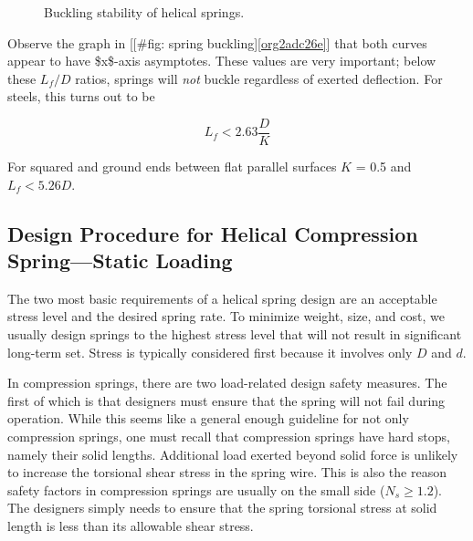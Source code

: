 \documentclass[a4paper,openany,12pt]{book}
\begin{document}
{{\begin{figure}[h]
  \centering
  \caption{Buckling stability of helical springs.}
  \label{fig: spring buckling}
\end{figure}

Observe the graph in [[\#fig: spring buckling]\ref{org2adc26e}]
that both curves appear to have \$x\$-axis asymptotes. These values are
very important; below these \(L_f/D\) ratios, springs will \emph{not} buckle
regardless of exerted deflection. For steels, this turns out to be

$$L_f < 2.63 \frac{D}{K}$$

For squared and ground ends between flat parallel surfaces \(K\) = 0.5 and
\(L_f < 5.26 D\).

\subsection{Design Procedure for Helical Compression Spring---Static Loading}
\label{sec:org7a6117d}
The two most basic requirements of a helical spring design are an
acceptable stress level and the desired spring rate. To minimize weight,
size, and cost, we usually design springs to the highest stress level
that will not result in significant long-term set. Stress is typically
considered first because it involves only \(D\) and \(d\).

In compression springs, there are two load-related design safety
measures. The first of which is that designers must ensure that the
spring will not fail during operation. While this seems like a general
enough guideline for not only compression springs, one must recall that
compression springs have hard stops, namely their solid lengths.
Additional load exerted beyond solid force is unlikely to increase the
torsional shear stress in the spring wire. This is also the reason
safety factors in compression springs are usually on the small side
(\(N_s \geq 1.2\)). The designers simply needs to ensure that the spring
torsional stress at solid length is less than its allowable shear
stress.

}}
\end{document}
